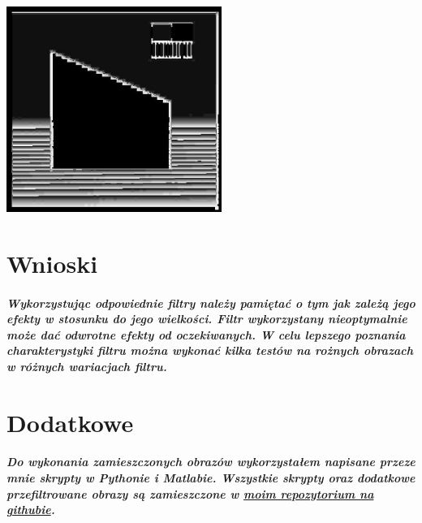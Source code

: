 \documentclass[a4paper,12pt,openany]{report}
\begin{document}
\begin{center}
\includegraphics[width=7cm]{resources/modified/sample/sample_ridge_detection_2.jpg}
\end{center}

\chapter{Wnioski}

\paragraph{\indent Wykorzystując odpowiednie filtry należy pamiętać o tym jak zależą jego efekty w stosunku do jego wielkości. Filtr wykorzystany nieoptymalnie może dać odwrotne efekty od oczekiwanych. W celu lepszego poznania charakterystyki filtru można wykonać kilka testów na rożnych obrazach w różnych wariacjach filtru.}


\chapter{Dodatkowe}
\paragraph{Do wykonania zamieszczonych obrazów wykorzystałem napisane przeze mnie skrypty w Pythonie i Matlabie. Wszystkie skrypty oraz dodatkowe przefiltrowane obrazy są zamieszczone w \href{https://github.com/FilipM13/CPS}{moim repozytorium na githubie}.}
\end{document}
